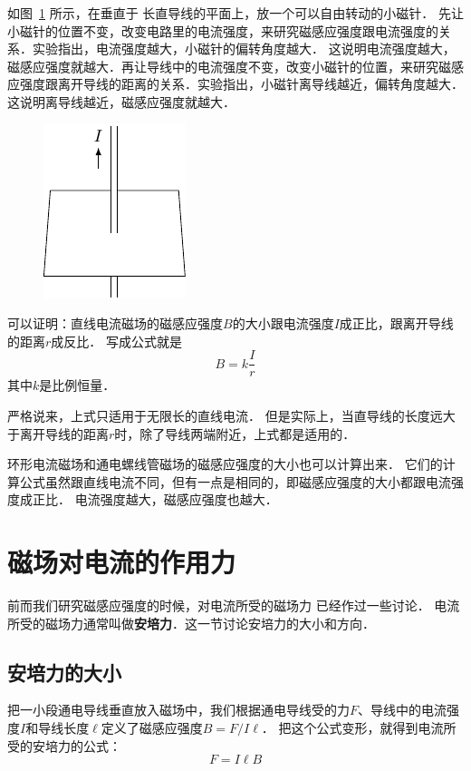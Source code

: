 如图~\ref{fig_C_1-20} 所示，在垂直于
长直导线的平面上，放一个可以自由转动的小磁针．
先让小磁针的位置不变，改变电路里的电流强度，来研究磁感应强度跟电流强度的关系．实验指出，电流强度越大，小磁针的偏转角度越大．
这说明电流强度越大，磁感应强度就越大．再让导线中的电流强度不变，改变小磁针的位置，来研究磁感应强度跟离开导线的距离的关系．实验指出，小磁针离导线越近，偏转角度越大．这说明离导线越近，磁感应强度就越大．
\begin{figure}[htbp]
	\centering
	\includegraphics{fig/C/1-20.pdf}
	\caption{ }\label{fig_C_1-20}
\end{figure}


可以证明：直线电流磁场的磁感应强度$B$的大小跟电流强度$I$成正比，跟离开导线的距离$r$成反比．
写成公式就是
\[B=k\frac{I}{r}\]
其中$k$是比例恒量．

严格说来，上式只适用于无限长的直线电流．
但是实际上，当直导线的长度远大于离开导线的距离$r$时，除了导线两端附近，上式都是适用的．

环形电流磁场和通电螺线管磁场的磁感应强度的大小也可以计算出来．
它们的计算公式虽然跟直线电流不同，但有一点是相同的，即磁感应强度的大小都跟电流强度成正比．
电流强度越大，磁感应强度也越大．

\section{磁场对电流的作用力}
前而我们研究磁感应强度的时候，对电流所受的磁场力
已经作过一些讨论．
电流所受的磁场力通常叫做\textbf{安培力}．这一节讨论安培力的大小和方向．

\subsection{安培力的大小}

把一小段通电导线垂直放入磁场中，我们根据通电导线受的力$F$、导线中的电流强度$I$和导线长度$\ell$定义了磁感应强度$B=F/I\ell$．
把这个公式变形，就得到电流所受的安培力的公式：
\[F=I\ell B\]


